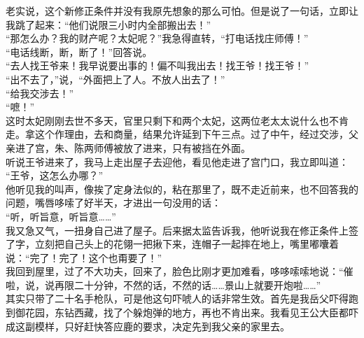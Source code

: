 老实说，这个新修正条件并没有我原先想象的那么可怕。但是说了一句话，立即让我跳了起来：“他们说限三小时内全部搬出去！”\\

“那怎么办？我的财产呢？太妃呢？”我急得直转，“打电话找庄师傅！”\\

“电话线断，断，断了！”回答说。\\

“去人找王爷来！我早说要出事的！偏不叫我出去！找王爷！找王爷！”\\

“出不去了，”说，“外面把上了人。不放人出去了！”\\

“给我交涉去！”\\

“嗻！”\\

这时太妃刚刚去世不多天，官里只剩下和两个太妃，这两位老太太说什么也不肯走。拿这个作理由，去和商量，结果允许延到下午三点。过了中午，经过交涉，父亲进了宫，朱、陈两师傅被放了进来，只有被挡在外面。\\

听说王爷进来了，我马上走出屋子去迎他，看见他走进了宫门口，我立即叫道：\\

“王爷，这怎么办哪？”\\

他听见我的叫声，像挨了定身法似的，粘在那里了，既不走近前来，也不回答我的问题，嘴唇哆嗦了好半天，才进出一句没用的话：\\

“听，听旨意，听旨意……”\\

我又急又气，一扭身自己进了屋子。后来据太监告诉我，他听说我在修正条件上签了字，立刻把自己头上的花翎一把揪下来，连帽子一起摔在地上，嘴里嘟囔着说：“完了！完了！这个也甭要了！”\\

我回到屋里，过了不大功夫，回来了，脸色比刚才更加难看，哆哆嗦嗦地说：“催啦，说，说再限二十分钟，不然的话，不然的话……景山上就要开炮啦……”\\

其实只带了二十名手枪队，可是他这句吓唬人的话非常生效。首先是我岳父吓得跑到御花园，东钻西藏，找了个躲炮弹的地方，再也不肯出来。我看见王公大臣都吓成这副模样，只好赶快答应鹿的要求，决定先到我父亲的家里去。\\

